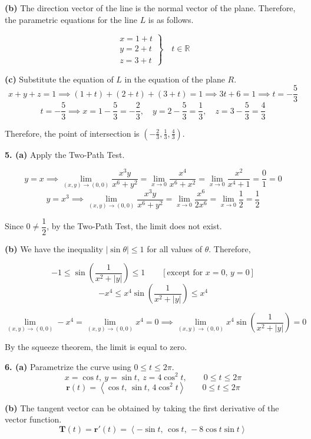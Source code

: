\documentclass{article}
\begin{document}
\textbf{(b)} The direction vector of the line is the normal vector of the plane. Therefore, the parametric equations for the line $L$ is as follows.

\[\boxed{\left.\begin{array}{l}
x=1+t\\
y=2+t\\
z=3+t
\end{array}\right\}\quad t\in\mathbb{R}}\]

\textbf{(c)} Substitute the equation of $L$ in the equation of the plane $R$.
\[x+y+z=1\implies (1+t)+(2+t)+(3+t)=1\implies 3t+6=1\implies t=-\frac53\]
\[t=-\frac53\implies x=1-\frac53=-\frac23,\quad y=2-\frac53=\frac13,\quad z=3-\frac53=\frac43\]

Therefore, the point of intersection is $\boxed{\left(-\frac23,\frac13,\frac43\right)}$.

\vspace{1em}

\textbf{5. (a)} Apply the Two-Path Test.

\[y=x\implies\lim_{(x,y)\to(0,0)}\frac{x^3y}{x^6+y^2}=\lim_{x\to0}\frac{x^4}{x^6+x^2}=\lim_{x\to0}\frac{x^2}{x^4+1}=\frac01=0\]
\[y=x^3\implies\lim_{(x,y)\to(0,0)}\frac{x^3y}{x^6+y^2}=\lim_{x\to0}\frac{x^6}{2x^6}=\lim_{x\to0}\frac12=\frac12\]

Since $0\neq\dfrac12$, by the Two-Path Test, the limit does not exist.

\textbf{(b)} We have the inequality $\left|\sin\theta\right|\leq1$ for all values of $\theta$. Therefore,

\[-1\leq\sin\left(\frac1{x^2+|y|}\right)\leq1\qquad\left[\text{except for }x=0,\,y=0\right]\]
\[-x^4\leq x^4\sin\left(\frac1{x^2+|y|}\right)\leq x^4\]

\[\lim_{(x,y)\to(0,0)}-x^4=\lim_{(x,y)\to(0,0)}x^4=0\implies\lim_{(x,y)\to(0,0)}x^4\sin\left(\frac1{x^2+|y|}\right)=\boxed0\]

By the squeeze theorem, the limit is equal to zero.

\vspace{1em}

\textbf{6. (a)} Parametrize the curve using $0\leq t\leq 2\pi$.
\[x=\cos t,\:y=\sin t,\:z=4\cos^2t,\qquad0\leq t\leq2\pi\]
\[\boxed{\mathbf r(t)=\left\langle\cos t,\,\sin t,\,4\cos^2t\right\rangle\qquad0\leq t\leq2\pi}\]

\textbf{(b)} The tangent vector can be obtained by taking the first derivative of the vector function.
\[\mathbf T(t)=\mathbf r'(t)=\left\langle-\sin t,\,\cos t,\,-8\cos t\sin t\right\rangle\]
\end{document}
